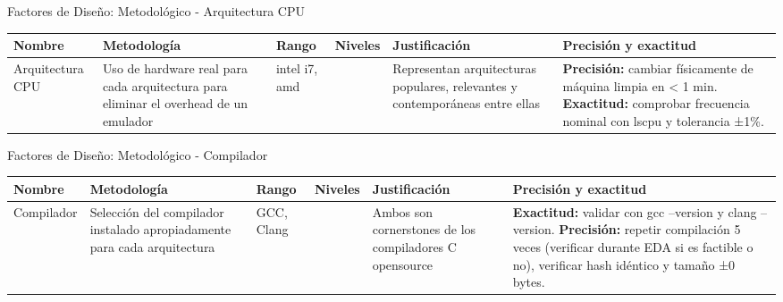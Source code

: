 \documentclass[aspectratio=169]{beamer}
\begin{document}
\begin{frame}{Factores de Diseño: Metodológico - Arquitectura CPU}
    \small
    \begin{table}
        \begin{tabularx}{\textwidth}{|>{\raggedright\arraybackslash}p{2cm}|>{\raggedright\arraybackslash}X|>{\raggedright\arraybackslash}p{1.5cm}|>{\raggedright\arraybackslash}p{1cm}|>{\raggedright\arraybackslash}p{2.5cm}|>{\raggedright\arraybackslash}X|}
            \hline
            \textbf{Nombre} & \textbf{Metodología} & \textbf{Rango} & \textbf{Niveles} & \textbf{Justificación} & \textbf{Precisión y exactitud} \\
            \hline
            Arquitectura CPU & Uso de hardware real para cada arquitectura para eliminar el overhead de un emulador & intel i7, amd & 2 & Representan arquitecturas populares, relevantes y contemporáneas entre ellas & \textbf{Precisión:} cambiar físicamente de máquina limpia en < 1 min. \textbf{Exactitud:} comprobar frecuencia nominal con lscpu y tolerancia ±1\%. \\
            \hline
        \end{tabularx}
    \end{table}
\end{frame}

\begin{frame}{Factores de Diseño: Metodológico - Compilador}
    \small
    \begin{table}
        \begin{tabularx}{\textwidth}{|>{\raggedright\arraybackslash}p{2cm}|>{\raggedright\arraybackslash}X|>{\raggedright\arraybackslash}p{1.5cm}|>{\raggedright\arraybackslash}p{1cm}|>{\raggedright\arraybackslash}p{2.5cm}|>{\raggedright\arraybackslash}X|}
            \hline
            \textbf{Nombre} & \textbf{Metodología} & \textbf{Rango} & \textbf{Niveles} & \textbf{Justificación} & \textbf{Precisión y exactitud} \\
            \hline
            Compilador & Selección del compilador instalado apropiadamente para cada arquitectura & GCC, Clang & 2 & Ambos son cornerstones de los compiladores C opensource & \textbf{Exactitud:} validar con gcc --version y clang --version. \textbf{Precisión:} repetir compilación 5 veces (verificar durante EDA si es factible o no), verificar hash idéntico y tamaño ±0 bytes. \\
            \hline
        \end{tabularx}
    \end{table}
\end{frame}
\end{document}
